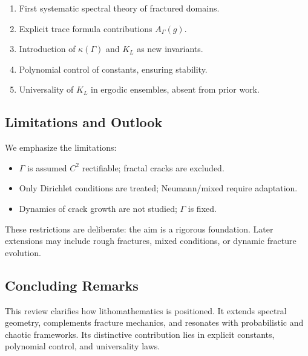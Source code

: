 \begin{enumerate}
  \item First systematic spectral theory of fractured domains.
  \item Explicit trace formula contributions $A_\Gamma(g)$.
  \item Introduction of $\kappa(\Gamma)$ and $K_L$ as new invariants.
  \item Polynomial control of constants, ensuring stability.
  \item Universality of $K_L$ in ergodic ensembles, absent from prior work.
\end{enumerate}

\subsection{Limitations and Outlook}

We emphasize the limitations:

\begin{itemize}
  \item $\Gamma$ is assumed $C^2$ rectifiable; fractal cracks are excluded.
  \item Only Dirichlet conditions are treated; Neumann/mixed require adaptation.
  \item Dynamics of crack growth are not studied; $\Gamma$ is fixed.
\end{itemize}

These restrictions are deliberate: the aim is a rigorous foundation. Later
extensions may include rough fractures, mixed conditions, or dynamic fracture
evolution.

\subsection{Concluding Remarks}

This review clarifies how lithomathematics is positioned. It extends spectral
geometry, complements fracture mechanics, and resonates with probabilistic and
chaotic frameworks. Its distinctive contribution lies in explicit constants,
polynomial control, and universality laws.



